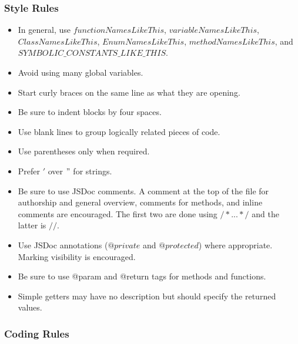 \documentclass[12pt]{article}
\begin{document}
\subsubsection{Style Rules}

\begin{itemize}

\item In general, use $functionNamesLikeThis$, $variableNamesLikeThis$, $ClassNamesLikeThis$, $EnumNamesLikeThis$, $methodNamesLikeThis$, and $SYMBOLIC\_CONSTANTS\_LIKE\_THIS$.

\item Avoid using many global variables.

\item Start curly braces on the same line as what they are opening.

\item Be sure to indent blocks by four spaces.

\item Use blank lines to group logically related pieces of code.

\item Use parentheses only when required.

\item Prefer $'$ over $"$ for strings.

\item Be sure to use JSDoc comments.  A comment at the top of the file for authorship and general overview, comments for methods, and inline comments are encouraged.  The first two are done using $/*. . . */$ and the latter is $//$.

\item Use JSDoc annotations ($@private$ and $@protected$) where appropriate.  Marking visibility is encouraged.

\item Be sure to use @param and @return tags for methods and functions.

\item Simple getters may have no description but should specify the returned values.

\end{itemize}



\subsubsection{Coding Rules}
\end{document}
